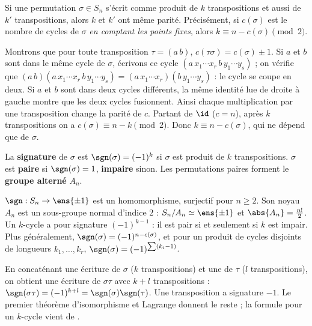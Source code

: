\begin{theoreme}[Parité]\label{thm-parite}
Si une permutation $\sigma\in S_n$ s'écrit comme produit de $k$ transpositions et aussi de $k'$ transpositions, alors $k$ et $k'$ ont même parité. Précisément, si $c(\sigma)$ est le nombre de cycles de $\sigma$ \emph{en comptant les points fixes}, alors $k\equiv n-c(\sigma)\pmod2$.
\end{theoreme}
\begin{preuve}
Montrons que pour toute transposition $\tau=(a\,b)$, $c(\tau\sigma)=c(\sigma)\pm1$. Si $a$ et $b$ sont dans le même cycle de $\sigma$, écrivons ce cycle $(a\,x_1\cdots x_r\,b\,y_1\cdots y_s)$ ; on vérifie que $(a\,b)(a\,x_1\cdots x_r\,b\,y_1\cdots y_s)=(a\,x_1\cdots x_r)(b\,y_1\cdots y_s)$ : le cycle se coupe en deux. Si $a$ et $b$ sont dans deux cycles différents, la même identité lue de droite à gauche montre que les deux cycles fusionnent. Ainsi chaque multiplication par une transposition change la parité de $c$. Partant de $\id$ ($c=n$), après $k$ transpositions on a $c(\sigma)\equiv n-k\pmod 2$. Donc $k\equiv n-c(\sigma)$, qui ne dépend que de $\sigma$.
\end{preuve}
\begin{definition}
La \textbf{signature} de $\sigma$ est $\sgn(\sigma)=(-1)^k$ si $\sigma$ est produit de $k$ transpositions. $\sigma$ est \textbf{paire} si $\sgn(\sigma)=1$, \textbf{impaire} sinon. Les permutations paires forment le \textbf{groupe alterné} $A_n$.
\end{definition}
\begin{theoreme}\label{thm-signature}
$\sgn:S_n\to\ens{\pm1}$ est un homomorphisme, surjectif pour $n\ge2$. Son noyau $A_n$ est un sous-groupe normal d'indice $2$ : $S_n/A_n\simeq\ens{\pm1}$ et $\abs{A_n}=\frac{n!}2$. Un $k$-cycle a pour signature $(-1)^{k-1}$ : il est pair si et seulement si $k$ est impair. Plus généralement, $\sgn(\sigma)=(-1)^{n-c(\sigma)}$, et pour un produit de cycles disjoints de longueurs $k_1,\dots,k_r$, $\sgn(\sigma)=(-1)^{\sum(k_i-1)}$.
\end{theoreme}
\begin{preuve}
En concaténant une écriture de $\sigma$ ($k$ transpositions) et une de $\tau$ ($l$ transpositions), on obtient une écriture de $\sigma\tau$ avec $k+l$ transpositions : $\sgn(\sigma\tau)=(-1)^{k+l}=\sgn(\sigma)\sgn(\tau)$. Une transposition a signature $-1$. Le premier théorème d'isomorphisme et Lagrange donnent le reste ; la formule pour un $k$-cycle vient de .
\end{preuve}

